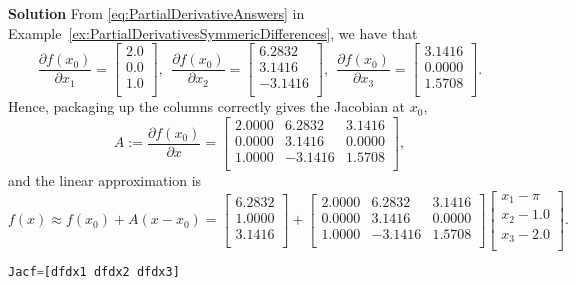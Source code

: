  \textbf{Solution} From \eqref{eq:PartialDerivativeAnswers} in Example~\ref{ex:PartialDerivativesSymmericDifferences}, we have that
$$
\frac{\partial f(x_0)}{\partial x_1} = \left[
\begin{array}{c}
2.0 \\
0.0 \\
1.0 \\
\end{array}
\right], ~~\frac{\partial f(x_0)}{\partial x_2} = \left[
\begin{array}{r}
6.2832 \\
3.1416 \\
-3.1416 \\
\end{array}
\right],~~ \frac{\partial f(x_0)}{\partial x_3} = 
\left[
\begin{array}{c}
3.1416 \\
0.0000 \\
1.5708 \\
\end{array}
\right].
$$
Hence, packaging up the columns correctly gives the Jacobian at $x_0$,
$$ A:=\frac{\partial f(x_0)}{\partial x} = \left[
\begin{array}{rrr}2.0000 & 6.2832 & 3.1416 \\
0.0000 & 3.1416 & 0.0000 \\
1.0000 & -3.1416 & 1.5708 \\
\end{array}
\right],$$
and the linear approximation is
$$f(x) \approx f(x_0) + A (x-x_0) = \left[
\begin{array}{c}
6.2832 \\
1.0000 \\
3.1416 \\
\end{array}
\right] + \left[
\begin{array}{rrr}2.0000 & 6.2832 & 3.1416 \\
0.0000 & 3.1416 & 0.0000 \\
1.0000 & -3.1416 & 1.5708 \\
\end{array}
\right] \left[ \begin{array}{l}
x_1 - \pi \\
x_2 - 1.0 \\
x_3 - 2.0 \\
\end{array}
\right]. $$

\begin{lstlisting}[language=Julia,style=mystyle]
Jacf=[dfdx1 dfdx2 dfdx3]
\end{lstlisting}

